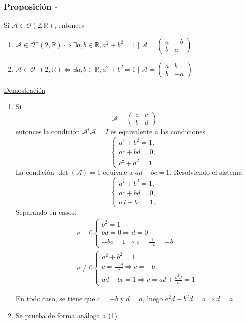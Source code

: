 \documentclass[12pt, a4paper, ones, notitlepage, openany,titlepage]{article}
\newcommand{\demostracion}{\noindent\underline{Demostración}}
\begin{document}
\subsubsection{Proposición - }
\noindent Si $\mathcal{A} \in \mathcal{O}(2, \mathbb{R})$, entonces
\begin{enumerate}[label=(\arabic*)]
	\item $\displaystyle \mathcal{A} \in \mathcal{O}^{+}(2, \mathbb{R}) \Longleftrightarrow \exists a, b \in \mathbb{R}, a^{2}+b^{2}=1 \mid \mathcal{A}=\left(\begin{array}{rr}
		a & -b \\
		b & a
	\end{array}\right)$
	\item $\displaystyle \mathcal{A} \in \mathcal{O}^{-}(2, \mathbb{R}) \Longleftrightarrow \exists a, b \in \mathbb{R}, a^{2}+b^{2}=1 \mid \mathcal{A}=\left(\begin{array}{rr}
		a & b \\
		b & -a
	\end{array}\right)$
\end{enumerate}

\demostracion
\begin{enumerate}[label=(\arabic*)]
	\item Si
	$$
	\mathcal{A}=\left(\begin{array}{ll}
		a & c \\
		b & d
	\end{array}\right)
	$$
	entonces la condición $\mathcal{A}^{t} \mathcal{A}=I$ es equivalente a las condiciones
	$$
	\begin{cases}
		a^{2}+b^{2}=1, \\ a c+b d=0, \\ c^{2}+d^{2}=1 .
	\end{cases}
	$$
	La condición $\det(\mathcal{A})=1$ equivale a $a d-b c=1$. Resolviendo el sistema
	$$
	\begin{cases}
		a^{2}+b^{2}=1, \\ a c+b d=0, \\ a d-b c=1,
	\end{cases}
	$$
	Separando en casos:
	\begin{align*}
		& a = 0
		\begin{cases}
			b^2 = 1 \\
			bd = 0 \Longrightarrow d = 0 \\
			-bc = 1 \Longrightarrow c = \frac{1}{-b} = -b
		\end{cases} \\
		& a \neq 0
		\begin{cases}
			a^2 + b^2 = 1 \\
			c = \frac{-bd}{a} \Longrightarrow c = -b \\
			ad-bc = 1 \Longrightarrow c = ad + \frac{b^2 d}{a} = 1
		\end{cases}
	\end{align*}
	
	En todo caso, se tiene que $c=-b$ y $d=a$, luego $a^2 d + b^2 d = a \Longrightarrow d = a$
	
	\item Se prueba de forma análoga a (1).
\end{enumerate}
\end{document}
